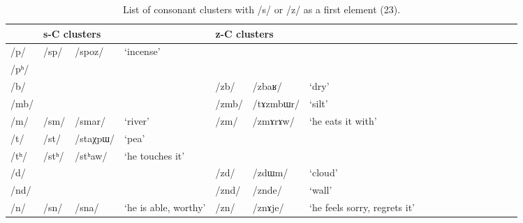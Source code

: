 \documentclass[12pt]{article}
\newcommand{\ipa}[1]{\mbox{\phon/#1/}}
\newcommand{\ipab}[1]{{\phon#1}}
\newcommand{\deux}[1]{\ipa{#1}\addtocounter{2clusters}{1}}
\begin{document}
 \begin{landscape}
 \begin{longtable}{lllllllllllllllll}
\caption{List of consonant clusters with \ipa{s} or \ipa{z} as a first element (23).}  \label{prein.s}\\
\toprule
& \multicolumn{3}{l}{\ipab{s}-C clusters} & \multicolumn{3}{l}{\ipab{z}-C clusters}  \\
\midrule
\ipa{p}  & 	 \deux{sp}  & 	 \ipa{spoz}  & 	 `incense'  & 	  & 	  & 	  & 	\\
\ipa{pʰ}  & 	  & 	  & 	  & 	  & 	  & 	  & 	\\
\ipa{b}  & 	  & 	  & 	  & 	 \deux{zb}  & 	 \ipa{zbaʁ}  & 	 `dry'  & 	\\
\ipa{mb}  & 	  & 	  & 	  & 	 \deux{zmb}  & 	 \ipa{tɤzmbɯr}  & 	 `silt'  & 	\\
\ipa{m}  & 	 \deux{sm}  & 	 \ipa{smar}  & 	 `river'  & 	 \deux{zm}  & 	 \ipa{zmɤrɤw}  & 	 `he eats it with'  & 	\\
\ipa{t}  & 	 \deux{st}  & 	 \ipa{staχpɯ}  & 	 `pea'  & 	  & 	  & 	  & 	\\
\ipa{tʰ}  & 	 \deux{stʰ}  & 	 \ipa{stʰaw}  & 	 `he touches it'  & 	  & 	  & 	  & 	\\
\ipa{d}  & 	  & 	  & 	  & 	 \deux{zd}  & 	 \ipa{zdɯm}  & 	 `cloud'  & 	\\
\ipa{nd}  & 	  & 	  & 	  & 	 \deux{znd}  & 	 \ipa{znde}  & 	 `wall'  & 	\\
\ipa{n}  & 	 \deux{sn}  & 	 \ipa{sna}  & 	 `he is able, worthy'  & 	 \deux{zn}  & 	 \ipa{znɤje}  & 	 `he feels sorry, regrets it'  & 	\\

\end{longtable}
\end{landscape}
\end{document}
